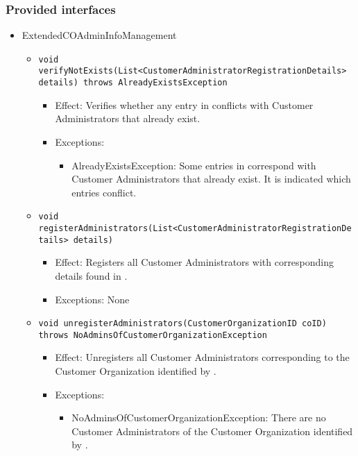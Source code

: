 \subsubsection*{Provided interfaces}
\begin{itemize}
    \item ExtendedCOAdminInfoManagement
    \begin{itemize}
        \item \texttt{void verifyNotExists(List<CustomerAdministratorRegistrationDetails> details) throws AlreadyExistsException}
        \begin{itemize}
            \item Effect: Verifies whether any entry in  conflicts with Customer Administrators that already exist.
            \item Exceptions:
            \begin{itemize}
                \item AlreadyExistsException: Some entries in  correspond with Customer Administrators that already exist. It is indicated which entries conflict.
            \end{itemize}
        \end{itemize}

        \item \texttt{void registerAdministrators(List<CustomerAdministratorRegistrationDetails> details)}
        \begin{itemize}
            \item Effect: Registers all Customer Administrators with corresponding details found in .
            \item Exceptions: None
        \end{itemize}

		\item \texttt{void unregisterAdministrators(CustomerOrganizationID coID) throws NoAdminsOfCustomerOrganizationException}
        \begin{itemize}
            \item Effect: Unregisters all Customer Administrators corresponding to the Customer Organization identified by .
            \item Exceptions:
			\begin{itemize}
				\item NoAdminsOfCustomerOrganizationException: There are no Customer Administrators of the Customer Organization identified by .
			\end{itemize}
        \end{itemize}


\end{itemize}
\end{itemize}
